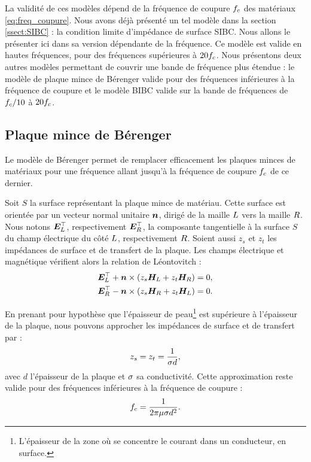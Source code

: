 La validité de ces modèles dépend de la fréquence de coupure $f_c$
des matériaux \eqref{eq:freq_coupure}. Nous avons déjà présenté un tel modèle dans la section
\ref{ssect:SIBC} : la condition limite d'impédance de surface SIBC.
Nous allons le présenter ici dans sa version dépendante de la fréquence.
Ce modèle est valide en hautes fréquences, pour des fréquences
supérieures à $20 f_c$.
Nous présentons deux autres modèles permettant de couvrir
une bande de fréquence plus étendue :
le modèle de plaque mince de Bérenger valide pour des fréquences inférieures
à la fréquence de coupure et le modèle BIBC valide sur la bande
de fréquences de $f_c / 10$ à $20 f_c$.
\\

\subsection{Plaque mince de Bérenger}
\label{ssect:berenger}

Le modèle de Bérenger \cite{berenger_thin_plane} permet de remplacer
efficacement les plaques minces de matériaux pour une fréquence
allant jusqu'à la fréquence de coupure $f_c$ de ce dernier.

Soit $S$ la surface représentant la plaque mince de matériau.
Cette surface est orientée par un vecteur normal unitaire $\bm{n}$,
dirigé de la maille $L$ vers la maille $R$.
Nous notons $\bm{E}_L^\top$, respectivement
$\bm{E}_R^\top$, la composante tangentielle à la surface $S$
du champ électrique du côté $L$, respectivement $R$.
Soient aussi $z_s$ et $z_t$ les impédances de surface et de
transfert de la plaque. Les champs électrique et magnétique
vérifient alors la relation de Léontovitch :
\begin{subequations}
	\begin{align} \label{eq:leontovich_transfert}
		\bm{E}_L^\top + \bm{n} \times (z_s \bm{H}_L + z_t \bm{H}_R) &= 0 ,
		\\
		\bm{E}_R^\top - \bm{n} \times (z_s \bm{H}_R + z_t \bm{H}_L) &= 0 .
	\end{align}
\end{subequations}

En prenant pour hypothèse que l’épaisseur de peau\footnote{L'épaisseur de la zone où se concentre le courant dans un conducteur, en surface.} est supérieure
à l’épaisseur de la plaque, nous pouvons approcher les impédances
de surface et de transfert par :
\begin{align}
	z_s = z_t = \frac{1}{\sigma d} ,
\end{align}
avec $d$ l'épaisseur de la plaque et $\sigma$ sa conductivité.
Cette approximation reste valide pour des fréquences inférieures
à la fréquence de coupure :
\begin{align}
	f_c = \frac{1}{2 \pi \mu \sigma d^2}
	\label{eq:freq_coupure} .
\end{align}


